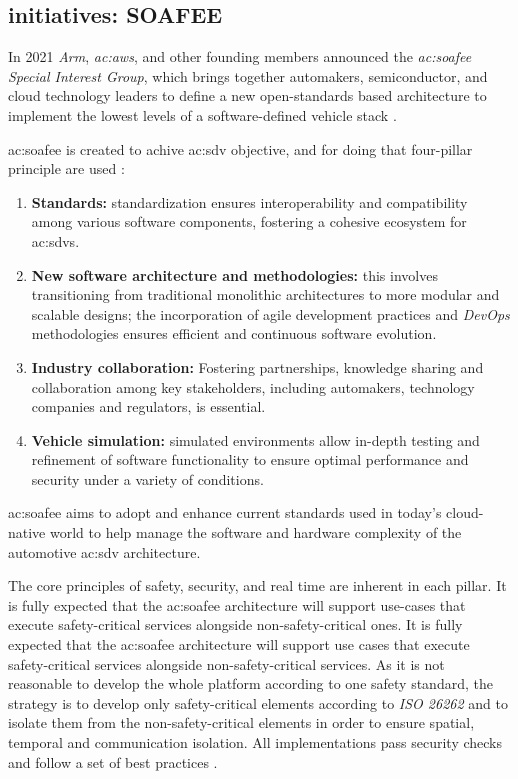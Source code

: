 \subsection{initiatives: SOAFEE}
In 2021 \textit{Arm}, \textit{\gls{ac:aws}}, and other founding members announced the \textit{\gls{ac:soafee} Special Interest Group}, which brings together automakers, semiconductor, and cloud technology leaders to define a new open-standards based architecture to implement the lowest levels of a software-defined vehicle stack \cite{DevelopersWorkflow}.

\gls{ac:soafee} is created to achive \gls{ac:sdv} objective, and for doing that four-pillar principle are used \cite{SoafeeProject}:
\begin{enumerate}
    \item \textbf{Standards:} standardization ensures interoperability and compatibility among various software components, fostering a cohesive ecosystem for \gls{ac:sdv}s.
    \item \textbf{New software architecture and methodologies:} this involves transitioning from traditional monolithic architectures to more modular and scalable designs; the incorporation of agile development practices and \textit{DevOps} methodologies ensures efficient and continuous software evolution.
    \item \textbf{Industry collaboration:} Fostering partnerships, knowledge sharing and collaboration among key stakeholders, including automakers, technology companies and regulators, is essential.
    \item \textbf{Vehicle simulation:} simulated environments allow in-depth testing and refinement of software functionality to ensure optimal performance and security under a variety of conditions.
\end{enumerate}
\gls{ac:soafee} aims to adopt and enhance current standards used in today's cloud-native world to help manage the software and hardware complexity of the automotive \gls{ac:sdv} architecture.

The core principles of safety, security, and real time are inherent in each pillar. It is fully expected that the \gls{ac:soafee} architecture will support use-cases that execute safety-critical services alongside non-safety-critical ones. It is fully expected that the \gls{ac:soafee} architecture will support use cases that execute safety-critical services alongside non-safety-critical services. As it is not reasonable to develop the whole platform according to one safety standard, the strategy is to develop only safety-critical elements according to \textit{ISO 26262} and to isolate them from the non-safety-critical elements in order to ensure spatial, temporal and communication isolation. All implementations pass security checks and follow a set of best practices \cite{SoafeeArchitectureOverview}.

